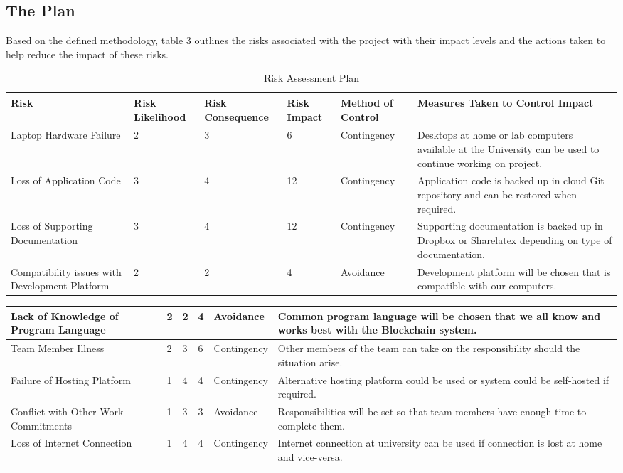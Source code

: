 \documentclass{article}
\begin{document}
\subsection{The Plan}
Based on the defined methodology, table 3 outlines the risks associated with the project with their impact levels and the actions taken to help reduce the impact of these risks.
\newpage
\begin{landscape}
\begin{table}[ht]
\caption{Risk Assessment Plan}
    \centering
    \begin{tabularx}{\linewidth}{|X|X|X|X|X|X|} \hline
    Risk & Risk Likelihood & Risk Consequence & Risk Impact & Method of Control & Measures Taken to Control Impact \tabularnewline
    \hline
    Laptop Hardware Failure & 2 & 3 & 6 & Contingency & Desktops at home or lab computers available at the University can be used to continue working on project. \\ \hline
    Loss of Application Code & 3 & 4 & 12 & Contingency & Application code is backed up in cloud Git repository and can be restored when required. \\ \hline
    Loss of Supporting Documentation & 3 & 4 & 12 & Contingency & Supporting documentation is backed up in Dropbox or Sharelatex depending on type of documentation. \\ \hline
    Compatibility issues with Development Platform & 2 & 2 & 4 & Avoidance & Development platform will be chosen that is compatible with our computers. \\ \hline
    \end{tabularx}
\end{table}
\newpage
\begin{table}[ht]
    \centering
    \begin{tabularx}{\linewidth}{|X|X|X|X|X|X|} \hline
    Lack of Knowledge of Program Language & 2 & 2 & 4 & Avoidance & Common program language will be chosen that we all know and works best with the Blockchain system. \\ \hline
    Team Member Illness & 2 & 3 & 6 & Contingency & Other members of the team can take on the responsibility should the situation arise. \\ \hline
    Failure of Hosting Platform & 1 & 4 & 4 & Contingency & Alternative hosting platform could be used or system could be self-hosted if required. \\ \hline
    Conflict with Other Work Commitments & 1 & 3 & 3 & Avoidance & Responsibilities will be set so that team members have enough time to complete them. \\ \hline
    Loss of Internet Connection & 1 & 4 & 4 & Contingency & Internet connection at university can be used if connection is lost at home and vice-versa. \\ \hline
    \end{tabularx}
\end{table}
\end{landscape}
\newpage
\end{document}
